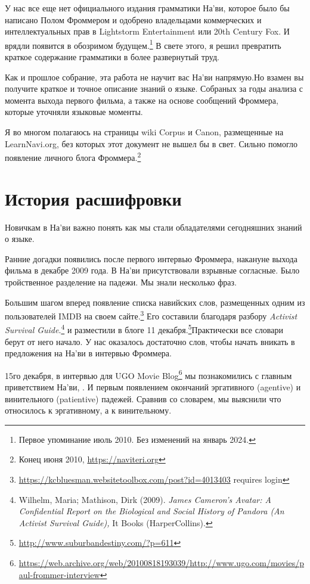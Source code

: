 
У нас все еще нет официального издания грамматики На'ви, которое
было бы написано Полом Фроммером и одобрено владельцами
коммерческих и интеллектуальных прав в Lightstorm Entertainment
или 20th Century Fox. И врядли появится в обозримом
будущем.\footnote{Первое упоминание июль 2010. Без изменений на
январь
2024.} В свете этого, я решил превратить краткое содержание
грамматики в более развернутый труд.

Как и прошлое собрание, эта работа не научит вас На'ви напрямую.Но взамен вы получите краткое и точное описание знаний о языке.
Собраных за годы анализа с момента выхода первого фильма, а
также на основе сообщений Фроммера, которые уточняли языковые
моменты.

Я во многом полагаюсь на страницы wiki Corpus и Canon,
размещенные на LearnNavi.org,
без которых этот документ не вышел бы в свет. Сильно помогло
появление личного блога Фроммера.\footnote{Конец июня 2010,
\url{https://naviteri.org}}


\section{История расшифровки}
Новичкам в На'ви важно понять как мы стали обладателями
сегодняшних знаний о языке.

Ранние догадки появились после первого интервью Фроммера,
накануне выхода фильма в декабре 2009 года. В На'ви
присутствовали взрывные согласные. Было тройственное разделение
на падежи. Мы знали несколько фраз.

Большим шагом вперед появление списка навийских слов,
размещенных одним из пользователей IMDB на своем
сайте.\footnote{\url{https://kcbluesman.websitetoolbox.com/post?id=4013403}
requires login} Его составили благодаря разбору \textit{Activist
Survival Guide}.\footnote{Wilhelm, Maria; Mathison, Dirk (2009).
\textit{James
Cameron's Avatar: A Confidential Report on the Biological and
Social
History of Pandora (An Activist Survival Guide),} It Books
(HarperCollins).}
и разместили в блоге 11
декабря.\footnote{\url{http://www.suburbandestiny.com/?p=611}}Практически
все словари берут от него начало. У нас оказалось достаточно
слов, чтобы начать вникать в предложения на На'ви в интервью
Фроммера.

15го декабря, в интервью для UGO Movie
Blog\footnote{\url{https://web.archive.org/web/20100818193039/http://www.ugo.com/movies/paul-frommer-interview}}
мы познакомились с главным приветствием На'ви,  . И первым появлением окончаний
эргативного (agentive) и винительного (patientive) падежей.
Сравнив со словарем, мы выяснили что  относилось к
эргативному, а  к винительному.

